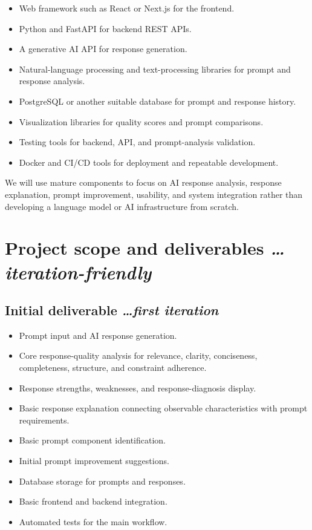 \documentclass[11pt,a4paper]{article}
\newcommand{\BvrHint}[1]{%
  {\normalfont\normalsize\itshape\hfill #1}}
\begin{document}
\begin{itemize}[leftmargin=0.7cm]
    \item Web framework such as React or Next.js for the frontend.
    \item Python and FastAPI for backend REST APIs.
    \item A generative AI API for response generation.
    \item Natural-language processing and text-processing libraries for
    prompt and response analysis.
    \item PostgreSQL or another suitable database for prompt and response
    history.
    \item Visualization libraries for quality scores and prompt comparisons.
    \item Testing tools for backend, API, and prompt-analysis validation.
    \item Docker and CI/CD tools for deployment and repeatable development.
\end{itemize}

We will use mature components to focus on AI response analysis, response
explanation, prompt improvement, usability, and system integration rather than
developing a language model or AI infrastructure from scratch.

\section{Project scope and deliverables%
  \BvrHint{\ldots iteration-friendly}}

\subsection{Initial deliverable%
  \BvrHint{\ldots first iteration}}

\begin{itemize}[leftmargin=0.7cm]
    \item Prompt input and AI response generation.
    \item Core response-quality analysis for relevance, clarity,
    conciseness, completeness, structure, and constraint adherence.
    \item Response strengths, weaknesses, and response-diagnosis display.
    \item Basic response explanation connecting observable characteristics
    with prompt requirements.
    \item Basic prompt component identification.
    \item Initial prompt improvement suggestions.
    \item Database storage for prompts and responses.
    \item Basic frontend and backend integration.
    \item Automated tests for the main workflow.
\end{itemize}
\end{document}
